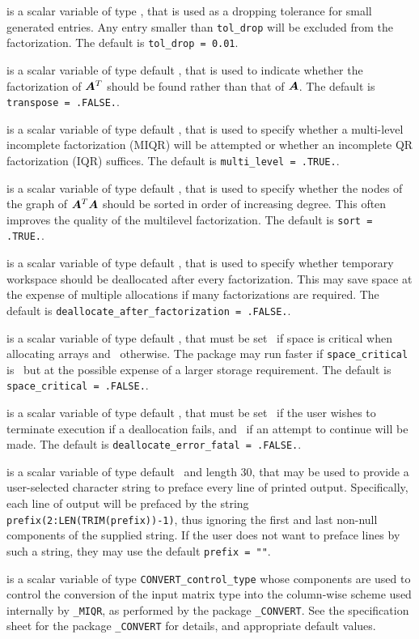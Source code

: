 \documentclass{galahad}
\newcommand{\packagename}{MIQR}
\newcommand{\fullpackagename}{\libraryname\_\packagename}
\begin{document}
\begin{description}
 is a scalar variable of type \realdp, that is used
as a dropping tolerance for small generated entries. Any entry smaller
than  {\tt tol\_drop} will be excluded from the factorization.
The default is {\tt tol\_drop = 0.01}.

 is a scalar variable of type default \logical, that is used
to indicate whether the factorization of ${\bm{A}}^T$ should be found rather
than that of ${\bm{A}}$. 
The default is {\tt transpose = .FALSE.}.

 is a scalar variable of type default \logical, that is used
to specify whether a multi-level incomplete factorization (MIQR) will be 
attempted or whether an incomplete QR factorization (IQR) suffices.
The default is {\tt multi\_level = .TRUE.}.

 is a scalar variable of type default \logical, that is used
to specify whether the nodes of the graph of ${\bm{A}}^T {\bm{A}}$ should be sorted
in order of increasing degree. This often improves the quality of the
multilevel factorization. 
The default is {\tt sort = .TRUE.}.

 is a scalar variable of type default 
\logical, that is used to specify whether temporary workspace 
should be deallocated after every factorization. This may save space
at the expense of multiple allocations if many factorizations are required.
The default is {\tt deallocate\_after\_factorization = .FALSE.}.

 is a scalar variable of type default \logical, 
that must be set \true\ if space is critical when allocating arrays
and  \false\ otherwise. The package may run faster if 
{\tt space\_critical} is \false\ but at the possible expense of a larger
storage requirement. The default is {\tt space\_critical = .FALSE.}.

 is a scalar variable of type default \logical, 
that must be set \true\ if the user wishes to terminate execution if
a deallocation  fails, and \false\ if an attempt to continue
will be made. The default is {\tt deallocate\_error\_fatal = .FALSE.}.

 is a scalar variable of type default \character\
and length 30, that may be used to provide a user-selected 
character string to preface every line of printed output. 
Specifically, each line of output will be prefaced by the string 
{\tt prefix(2:LEN(TRIM(prefix))-1)},
thus ignoring the first and last non-null components of the
supplied string. If the user does not want to preface lines by such
a string, they may use the default {\tt prefix = ""}.

 is a scalar variable of type 
{\tt CONVERT\_control\_type}
whose components are used to control the conversion of the
input matrix type into the column-wise scheme used internally
by  {\tt \fullpackagename}, as performed by the package 
{\tt \libraryname\_CONVERT}. 
See the specification sheet for the package 
{\tt \libraryname\_CONVERT} 
for details, and appropriate default values.

\end{description}
\end{document}
